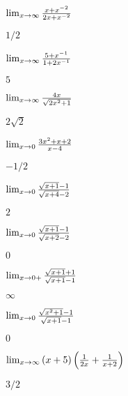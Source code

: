 \begin{exercises}
\begin{exercise} $\lim_{x\to\infty}{x+x^{-2}\over 2x+x^{-2}}$
\begin{answer} $1/2$
\end{answer}\end{exercise}

\begin{exercise} $\lim_{x\to\infty}{5+x^{-1}\over 1+2x^{-1}}$
\begin{answer} $5$
\end{answer}\end{exercise}

\begin{exercise} $\lim_{x\to\infty}{4x\over\sqrt{2x^2+1}}$
\begin{answer} $2\sqrt2$
\end{answer}\end{exercise}

\begin{exercise} $\lim_{x\to0}{3x^2+x+2\over x-4}$
\begin{answer} $-1/2$
\end{answer}\end{exercise}

\begin{exercise} $\lim_{x\to0}{\sqrt{x+1}-1\over \sqrt{x+4}-2}$
\begin{answer} $2$
\end{answer}\end{exercise}

\begin{exercise} $\lim_{x\to0}{\sqrt{x+1}-1\over \sqrt{x+2}-2}$
\begin{answer} $0$
\end{answer}\end{exercise}

\begin{exercise} $\lim_{x\to0+}{\sqrt{x+1}+1\over\sqrt{x+1}-1}$
\begin{answer} $\infty$
\end{answer}\end{exercise}

\begin{exercise} $\lim_{x\to0}{\sqrt{x^2+1}-1\over\sqrt{x+1}-1}$
\begin{answer} $0$
\end{answer}\end{exercise}

\begin{exercise} $\lim_{x\to\infty}{(x+5)\left({1\over 2x}+{1\over x+2}\right)}$
\begin{answer} $3/2$
\end{answer}\end{exercise}


\end{exercises}
